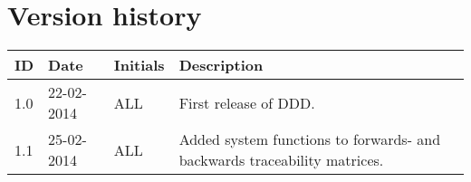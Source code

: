 \documentclass[Main]{subfiles}
\begin{document}
\section*{Version history}

\begin{tabular}{p{} p{} p{} p{}}
\hline
\textbf{ID} & \textbf{Date} & \textbf{Initials} & \textbf{Description}
\\
\hline
1.0 & 22-02-2014 & ALL & First release of DDD.
\\
1.1 & 25-02-2014 & ALL & Added  system functions to forwards- and backwards traceability matrices.\\\hline 
\end{tabular} 
\end{document}
